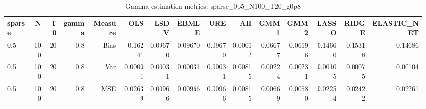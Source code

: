 \begin{table}[!htbp]\centering
\caption{Gamma estimation metrics: sparse_0p5_N100_T20_g0p8}
\label{tab:table1_sparse_0p5_N100_T20_g0p8}
\begin{tabular}{lrrrrrrrrrrrrrr}
\hline
sparse & N & T0 & gamma & Measure & OLS & LSDV & EBMLE & URE & AH & GMM1 & GMM2 & LASSO & RIDGE & ELASTIC_NET \\
\hline
0.5 & 100 & 20 & 0.8 & Bias & -0.16241 & 0.09670 & 0.09670 & 0.09670 & 0.00062 & 0.06677 & 0.06696 & -0.14660 & -0.15318 & -0.14686 \\
0.5 & 100 & 20 & 0.8 & Var & 0.00001 & 0.00031 & 0.00031 & 0.00031 & 0.00815 & 0.00224 & 0.00231 & 0.00105 & 0.00075 & 0.00104 \\
0.5 & 100 & 20 & 0.8 & MSE & 0.02639 & 0.00966 & 0.00966 & 0.00966 & 0.00815 & 0.00669 & 0.00680 & 0.02254 & 0.02422 & 0.02261 \\
\hline
\end{tabular}
\end{table}

